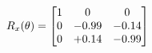 \documentclass[preview]{standalone}
\begin{document}
\begin{align*}
\special{dvisvgm:raw <g id='unique000'>}R_{x}(\theta) = \begin{bmatrix}1 & 0 & 0 \\0 & -0.99 & -0.14 \\0 & +0.14 & -0.99\end{bmatrix}\special{dvisvgm:raw </g>}
\end{align*}
\end{document}
